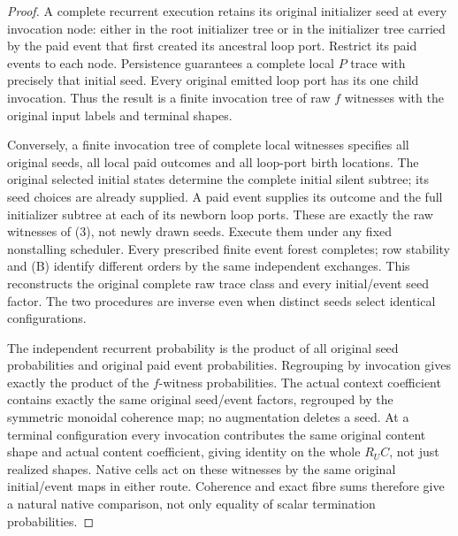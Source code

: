 \documentclass[11pt]{article}
\begin{document}
\begin{proof}
A complete recurrent execution retains its original initializer seed at every
invocation node: either in the root initializer tree or in the initializer
tree carried by the paid event that first created its ancestral loop port.
Restrict its paid events to each node. Persistence guarantees a complete local
$P$ trace with precisely that initial seed. Every original emitted loop port
has its one child invocation. Thus the result is a finite invocation tree of
raw $f$ witnesses with the original input labels and terminal shapes.

Conversely, a finite invocation tree of complete local witnesses specifies
all original seeds, all local paid outcomes and all loop-port birth locations.
The original selected initial states determine the complete initial silent
subtree; its seed choices are already supplied. A paid event supplies its
outcome and the full initializer subtree at each of its newborn loop ports.
These are exactly the raw witnesses of (3), not newly drawn seeds. Execute
them under any fixed nonstalling scheduler. Every prescribed finite event
forest completes; row stability and (B) identify different orders by the
same independent exchanges. This reconstructs the original complete raw
trace class and every initial/event seed factor. The two procedures are
inverse even when distinct seeds select identical configurations.

The independent recurrent probability is the product of all original seed
probabilities and original paid event probabilities. Regrouping by invocation
gives exactly the product of the $f$-witness probabilities. The actual context
coefficient contains exactly the same original seed/event factors, regrouped
by the symmetric monoidal coherence map; no augmentation deletes a seed.
At a terminal configuration every invocation contributes the same original
content shape and actual content coefficient, giving identity on the whole
$R_U C$, not just realized shapes. Native cells act on these witnesses by the
same original initial/event maps in either route. Coherence and exact fibre
sums therefore give a natural native comparison, not only equality of scalar
termination probabilities.
\end{proof}
\end{document}
